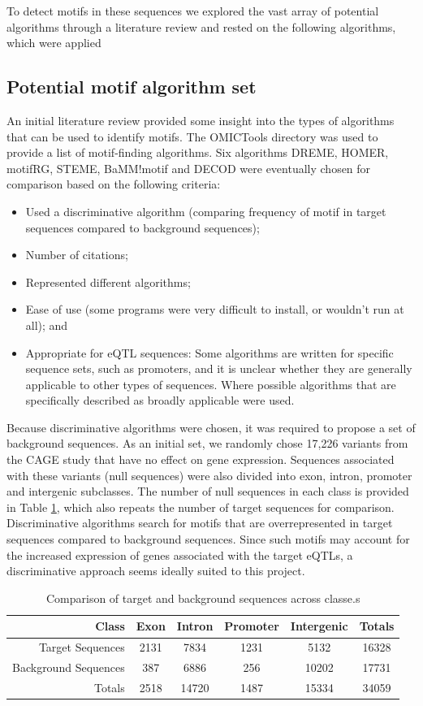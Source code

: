 \documentclass[12pt, onecolumn, oneside]{gsajnl}
\begin{document}
To detect motifs in these sequences we explored the vast array of potential algorithms through a literature review and rested on the following algorithms, 
which were applied  
 
\subsection{Potential motif algorithm set}

An initial literature review provided some insight into the types of algorithms that can be used to identify motifs. The OMICTools directory \citep{henry2014omictools} was used to provide a list of motif-finding algorithms. Six algorithms DREME, HOMER, motifRG, STEME, BaMM!motif and DECOD were eventually chosen for comparison based on the following criteria:
\begin{itemize}
\item Used a discriminative algorithm (comparing frequency of motif in target sequences compared to background sequences);
\item Number of citations;
\item Represented different algorithms;
\item Ease of use (some programs were very difficult to install, or wouldn't run at all); and
\item Appropriate for eQTL sequences: Some algorithms are written for specific sequence sets, such as promoters, and it is unclear whether they are generally applicable to other types of sequences. Where possible algorithms that are specifically described as broadly applicable were used.
\end{itemize}
Because discriminative algorithms were chosen, it was required to propose a set of background sequences. As an initial set, we randomly chose 17,226 variants from the CAGE study that have no effect on gene expression. Sequences associated with these variants (null sequences) were also divided into exon, intron, promoter and intergenic subclasses. The number of null sequences in each class is provided in Table \ref{freqComparisons}, which also repeats the number of target sequences for comparison. Discriminative algorithms search for motifs that are overrepresented in target sequences compared to background sequences. Since such motifs may
account for the increased expression of genes associated with the target eQTLs, a discriminative approach seems ideally suited to this project.

\begin{table}[!htbp]
\centering
\caption{Comparison of target and background sequences across classe.s}\label{freqComparisons}
\begin{tabular}{r|cccc|c}
\hline
Class & Exon & Intron & Promoter & Intergenic & Totals\\ \hline
Target Sequences & 2131 & 7834 & 1231 & 5132 & 16328\\ \hline
Background Sequences & 387 & 6886 & 256 & 10202 & 17731\\ \hline
Totals & 2518 & 14720 & 1487 & 15334 & 34059
\end{tabular}
\end{table} 
\end{document}
